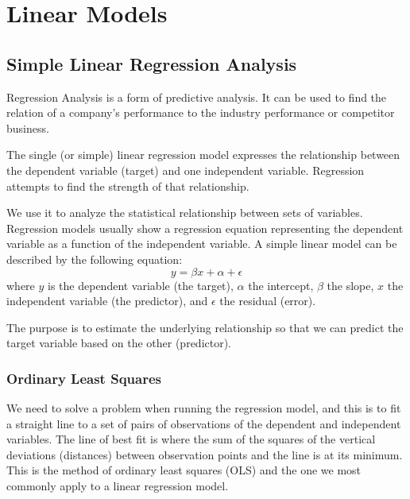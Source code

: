 \chapter{Linear Models}
\label{linear-models}

\section{Simple Linear Regression Analysis}
\label{sec:linear-regression}
Regression Analysis is a form of predictive analysis. It can be used to find the relation of a company’s performance to the industry performance or competitor business.

The single (or simple) linear regression model expresses the relationship between the dependent variable (target) and one independent variable. Regression attempts to find the strength of that relationship.

We use it to analyze the statistical relationship between sets of variables. Regression models usually show a regression equation representing the dependent variable as a function of the independent variable.
A simple linear model can be described by the following equation:
\begin{equation}
y = \beta x + \alpha + \epsilon
\label{eq:linear_regression}
\end{equation}
where $y$ is the dependent variable (the target), $\alpha$ the intercept, $\beta$ the slope, $x$ the independent variable (the predictor), and $\epsilon$ the residual (error).

The purpose is to estimate the underlying relationship so that we can predict the target variable based on the other (predictor).


\subsection{Ordinary Least Squares}
We need to solve a problem when running the regression model, and this is to fit a straight line to a set of pairs of observations of the dependent and independent variables. The line of best fit is where the sum of the squares of the vertical deviations (distances) between observation points and the line is at its minimum. This is the method of ordinary least squares (OLS) and the one we most commonly apply to a linear regression model.

